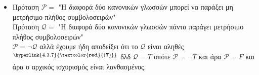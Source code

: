 \begin{tcolorbox}[colback=yellow!15!white, colframe=blue!50!white,
	fonttitle=\bfseries\Large, title = Απόδειξη - μέρος 2/2]
\begin{itemize}
	\item Πρόταση $\mathcal{P} =$ "Η διαφορά δύο κανονικών γλωσσών μπορεί να παράξει μη μετρήσιμο πλήθος
	συμβολοσειρών"\\
	Πρόταση $\mathcal{Q} =$ "Η διαφορά δύο κανονικών γλωσσών πάντα παράγει μετρήσιμο πλήθος συμβολοσειρών"\\
	$\mathcal{P} = \neg\mathcal{Q}$ αλλά έχουμε ήδη αποδείξει ότι το $\mathcal{Q}$ είναι
	αληθές$^{\hyperlink{4.3.7}{\bf{\textcolor{red}{(7)}}}}$ δλδ $\mathcal{Q} = Τ$ οπότε $\mathcal{P} = \neg Τ$ και
	άρα $\mathcal{P} = F$ και άρα ο αρχικός ισχυρισμός είναι λανθασμένος.
	\reducevspace\reducevspace\reducevspace\reducevspace\reducevspace\reducevspace\reducevspace
	\reducevspace\reducevspace\reducevspace\reducevspace\reducevspace\reducevspace\reducevspace
	\begin{flushright}\bf{\qedsymbol{}}\end{flushright}

\end{itemize}
\end{tcolorbox}

